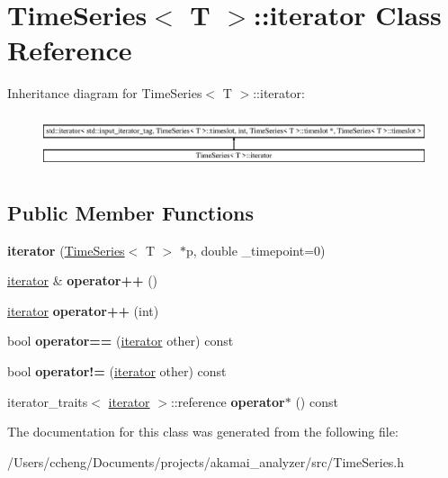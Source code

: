 \hypertarget{class_time_series_1_1iterator}{}\section{Time\+Series$<$ T $>$\+:\+:iterator Class Reference}
\label{class_time_series_1_1iterator}
Inheritance diagram for Time\+Series$<$ T $>$\+:\+:iterator\+:\begin{figure}[H]
\begin{center}
\leavevmode
\includegraphics[height=1.584159cm]{class_time_series_1_1iterator}
\end{center}
\end{figure}
\subsection*{Public Member Functions}
\begin{DoxyCompactItemize}
\item 
\mbox{\label{class_time_series_1_1iterator_a67884c3163708f5898d86c08d66f4e47}} 
{\bfseries iterator} (\mbox{\hyperlink{class_time_series}{Time\+Series}}$<$ T $>$ $\ast$p, double \+\_\+timepoint=0)
\item 
\mbox{\label{class_time_series_1_1iterator_a823ab3a7ba9e70776a3865a3b9f39113}} 
\mbox{\hyperlink{class_time_series_1_1iterator}{iterator}} \& {\bfseries operator++} ()
\item 
\mbox{\label{class_time_series_1_1iterator_a1c47c88818865e05d37b7b5a42fc6c65}} 
\mbox{\hyperlink{class_time_series_1_1iterator}{iterator}} {\bfseries operator++} (int)
\item 
\mbox{\label{class_time_series_1_1iterator_a9691ae899619277a4c3aa88b64166efc}} 
bool {\bfseries operator==} (\mbox{\hyperlink{class_time_series_1_1iterator}{iterator}} other) const
\item 
\mbox{\label{class_time_series_1_1iterator_a72462d4321fdb80297b8bd91b3896063}} 
bool {\bfseries operator!=} (\mbox{\hyperlink{class_time_series_1_1iterator}{iterator}} other) const
\item 
\mbox{\label{class_time_series_1_1iterator_a290d256ff98882a20f1ae34b63e8e29d}} 
iterator\+\_\+traits$<$ \mbox{\hyperlink{class_time_series_1_1iterator}{iterator}} $>$\+::reference {\bfseries operator$\ast$} () const
\end{DoxyCompactItemize}


The documentation for this class was generated from the following file\+:\begin{DoxyCompactItemize}
\item 
/\+Users/ccheng/\+Documents/projects/akamai\+\_\+analyzer/src/Time\+Series.\+h\end{DoxyCompactItemize}
